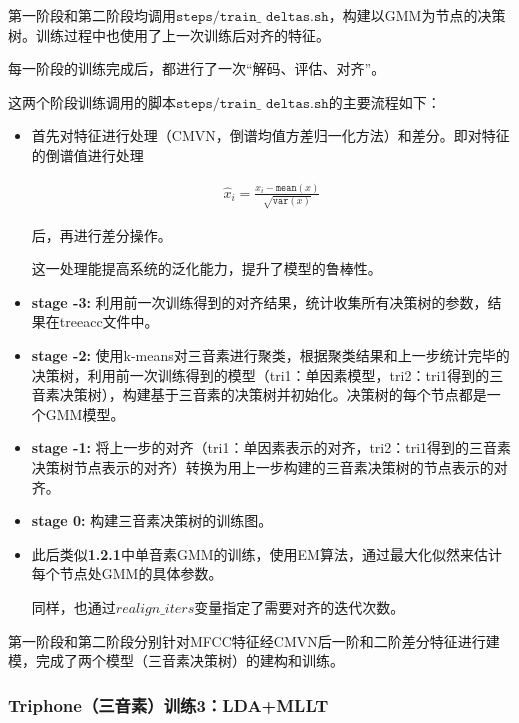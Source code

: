 \documentclass[a4paper]{article}
\renewcommand{\tt}[1]{\mathtt{#1}}
\begin{document}
第一阶段和第二阶段均调用$\tt{steps/train\_}$ $\tt{deltas.sh}$，构建以GMM为节点的决策树。训练过程中也使用了上一次训练后对齐的特征。

每一阶段的训练完成后，都进行了一次“解码、评估、对齐”。

\vspace{1em}
这两个阶段训练调用的脚本$\tt{steps/train\_}$ $\tt{deltas.sh}$的主要流程如下：

\begin{itemize}
    \item 首先对特征进行处理（CMVN，倒谱均值方差归一化方法）和差分。即对特征的倒谱值进行处理
    
    \vspace{-2em}
    \begin{align*}
        \hat{x}_i = \frac{x_i-\tt{mean}(x)}{\sqrt{\tt{var}(x)}}
    \end{align*}
    
    后，再进行差分操作。
    
    这一处理能提高系统的泛化能力，提升了模型的鲁棒性。
    
    \item \textbf{stage -3:} 利用前一次训练得到的对齐结果，统计收集所有决策树的参数，结果在treeacc文件中。
    \item \textbf{stage -2:} 使用k-means对三音素进行聚类，根据聚类结果和上一步统计完毕的决策树，利用前一次训练得到的模型（tri1：单因素模型，tri2：tri1得到的三音素决策树），构建基于三音素的决策树并初始化。决策树的每个节点都是一个GMM模型。
    \item \textbf{stage -1:} 
    将上一步的对齐（tri1：单因素表示的对齐，tri2：tri1得到的三音素决策树节点表示的对齐）转换为用上一步构建的三音素决策树的节点表示的对齐。
    \item \textbf{stage 0:}
    构建三音素决策树的训练图。
    \item 此后类似\textbf{1.2.1}中单音素GMM的训练，使用EM算法，通过最大化似然来估计每个节点处GMM的具体参数。
    
    同样，也通过${realign\_iters}$变量指定了需要对齐的迭代次数。
    
\end{itemize}

第一阶段和第二阶段分别针对MFCC特征经CMVN后一阶和二阶差分特征进行建模，完成了两个模型（三音素决策树）的建构和训练。

\vspace{2em}

\subsubsection{Triphone（三音素）训练3：LDA+MLLT}
\end{document}
